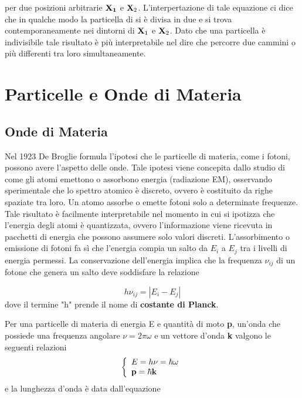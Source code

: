 per due posizioni arbitrarie $\bold{X_1}$ e $\bold{X}_2$. L'interpertazione di tale equazione ci dice che in qualche modo la particella di si \`e divisa in due e si trova contemporaneamente nei dintorni di $\bold{X}_1$ e $\bold{X}_2$. Dato che una particella \`e indivisibile tale risultato \`e pi\`u interpretabile nel dire che percorre due cammini o pi\`u differenti tra loro simultaneamente.
\section{Particelle e Onde di Materia}

\subsection{Onde di Materia}

Nel 1923 De Broglie formula l'ipotesi che le particelle di materia, come i fotoni, possono avere l'aspetto delle onde. Tale ipotesi viene concepita dallo studio di come gli atomi emettono o assorbono energia (radiazione EM), osservando sperimentale che lo spettro atomico \`e discreto, ovvero \`e costituito da righe spaziate tra loro. Un atomo assorbe o emette fotoni solo a determinate frequenze. Tale risultato \`e facilmente interpretabile nel momento in cui si ipotizza che l'energia degli atomi \`e quantizzata, ovvero l'informazione viene ricevuta in pacchetti di energia che possono assumere solo valori discreti. L'assorbimento o emissione di fotoni fa s\`i che l'energia compia un salto da $E_i$ a $E_j $ tra i livelli di energia permessi. La conservazione dell'energia implica che la frequenza $\nu_{ij}$ di un fotone che genera un salto deve soddisfare la relazione 

\begin{equation}
	h \nu_{ij} = |E_i -E_j|
\end{equation} 
dove il termine "h" prende il nome di \textbf{costante di Planck}.

\noindent Per una particelle di materia di energia E e quantit\`a di moto \textbf{p}, un'onda che possiede una frequenza angolare $\nu = 2\pi \omega$ e un vettore d'onda \textbf{k} valgono le seguenti relazioni
\begin{equation}
\left \{ \begin{array}{l}
	E = h\nu = \hbar \omega \\
	\bold{p} = \hbar \bold{k}
\end{array} \right.
\end{equation}
e la lunghezza d'onda \`e data dall'equazione 

